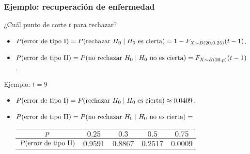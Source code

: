 \documentclass[table]{beamer}
\begin{document}
\begin{frame}
    \frametitle{Ejemplo: recuperación de enfermedad}
    \begin{block}{¿Cuál punto de corte $t$ para rechazar?}
        \begin{itemize}
            \item $\prob{\text{error de tipo I}} = \prob{\text{rechazar } H_{0} \mid H_{0} \text{ es cierta}}
                    = 1 - \pFF{X \sim \binomial{20}{0.25}}{t - 1}$.
            \item $\prob{\text{error de tipo II}} = \prob{\text{no rechazar } H_{0} \mid H_{0} \text{ no es cierta}} = \pFF{X \sim \binomial{20}{p}}{t - 1}$.
        \end{itemize}
    \end{block}
    \begin{exampleblock}{Ejemplo: $t = 9$}
        \begin{itemize}
            \item $\prob{\text{error de tipo I}} = \prob{\text{rechazar } H_{0} \mid H_{0} \text{ es cierta}}
                    \approx 0.0409$.
            \item $\prob{\text{error de tipo II}} = \prob{\text{no rechazar } H_{0} \mid H_{0} \text{ no es cierta}} =$
                \begin{center}
                    \begin{tabular}{c|cccc}
                        $p$ & $0.25$ & $0.3$ & $0.5$ & $0.75$ \\
                        \hline
                        $\prob{\text{error de tipo II}}$ & $0.9591$ & $0.8867$ & $0.2517$ & $0.0009$
                    \end{tabular}
                \end{center}
        \end{itemize}
    \end{exampleblock}
    \begin{center}
    \end{center}
\end{frame}
\end{document}
